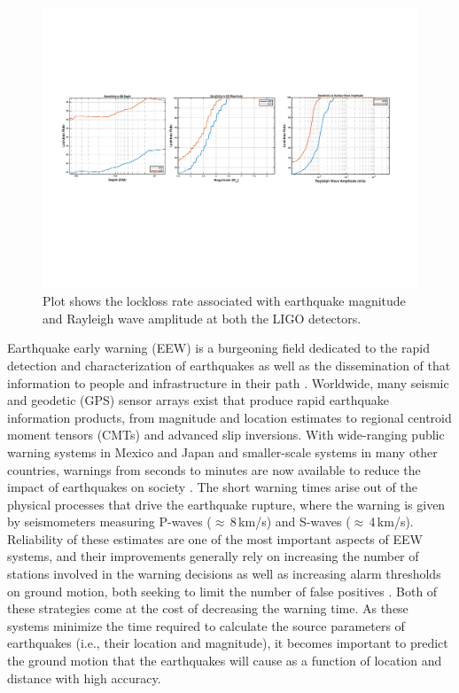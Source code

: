 \documentclass[twocolumn, aps, superscriptaddress]{revtex4}
\begin{document}
\begin{figure}[!htb]
  \includegraphics[width=\textwidth]{./plots/Lockloss_Sensitivity_3.pdf}
 \caption{Plot shows the lockloss rate associated with earthquake magnitude and Rayleigh wave amplitude at both the LIGO detectors.}
 \label{fig:lockloss_sensitivity}
\end{figure}


Earthquake early warning (EEW) is a burgeoning field dedicated to the rapid detection and characterization of earthquakes as well as the dissemination of that information to people and infrastructure in their path \cite{Al2012,KuAl2013a,KuAl2013b,KuHe2014,CoLa2009a,CoLa2009b,BoAl2014,HoKa2008,HoEA2011c,StAl2016}.
Worldwide, many seismic and geodetic (GPS) sensor arrays exist that produce rapid earthquake information products, from magnitude and location estimates to regional centroid moment tensors (CMTs) and advanced slip inversions.
With wide-ranging public warning systems in Mexico and Japan and smaller-scale systems in many other countries, warnings from seconds to minutes are now available to reduce the impact of earthquakes on society \cite{StAl2016}.
The short warning times arise out of the physical processes that drive the earthquake rupture, where the warning is given by seismometers measuring P-waves ($\approx$\,8\,km/s) and S-waves ($\approx$\,4\,km/s).
Reliability of these estimates are one of the most important aspects of EEW systems, and their improvements generally rely on increasing the number of stations involved in the warning decisions as well as increasing alarm thresholds on ground motion, both seeking to limit the number of false positives \cite{KuCo2015}. Both of these strategies come at the cost of decreasing the warning time. 
As these systems minimize the time required to calculate the source parameters of earthquakes (i.e., their location and magnitude), it becomes important to predict the ground motion that the earthquakes will cause as a function of location and distance with high accuracy.
\end{document}
